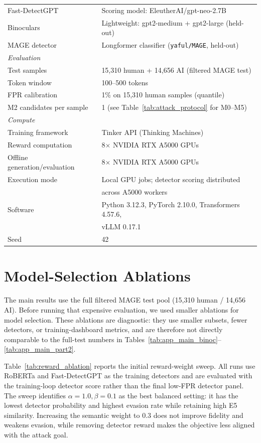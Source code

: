 \documentclass[11pt]{article}
\begin{document}
\begin{center}
{\begin{tabular}{ll}
Fast-DetectGPT & Scoring model: EleutherAI/gpt-neo-2.7B \\
Binoculars & Lightweight: gpt2-medium + gpt2-large (held-out) \\
MAGE detector & Longformer classifier (\texttt{yaful/MAGE}, held-out) \\
\midrule
\multicolumn{2}{l}{\textit{Evaluation}} \\
Test samples & 15,310 human + 14,656 AI (filtered MAGE test) \\
Token window & 100--500 tokens \\
FPR calibration & 1\% on 15,310 human samples (quantile) \\
M2 candidates per sample & 1 (see Table~\ref{tab:attack_protocol} for M0--M5) \\
\midrule
\multicolumn{2}{l}{\textit{Compute}} \\
Training framework & Tinker API (Thinking Machines) \\
Reward computation & 8$\times$ NVIDIA RTX A5000 GPUs \\
Offline generation/evaluation & 8$\times$ NVIDIA RTX A5000 GPUs \\
Execution mode & Local GPU jobs; detector scoring distributed \\
& across A5000 workers \\
Software & Python 3.12.3, PyTorch 2.10.0, Transformers 4.57.6, \\
& vLLM 0.17.1 \\
Seed & 42 \\
\bottomrule
\end{tabular}
}
\label{tab:hyperparams}
\end{center}

\FloatBarrier
\section{Model-Selection Ablations}
\label{app:ablations}

The main results use the full filtered MAGE test pool (15,310 human / 14,656 AI). Before running that expensive evaluation, we used smaller ablations for model selection. These ablations are diagnostic: they use smaller subsets, fewer detectors, or training-dashboard metrics, and are therefore not directly comparable to the full-test numbers in Tables~\ref{tab:app_main_binoc}--\ref{tab:app_main_part2}.

Table~\ref{tab:reward_ablation} reports the initial reward-weight sweep. All runs use RoBERTa and Fast-DetectGPT as the training detectors and are evaluated with the training-loop detector score rather than the final low-FPR detector panel. The sweep identifies $\alpha{=}1.0,\beta{=}0.1$ as the best balanced setting: it has the lowest detector probability and highest evasion rate while retaining high E5 similarity. Increasing the semantic weight to 0.3 does not improve fidelity and weakens evasion, while removing detector reward makes the objective less aligned with the attack goal.
\end{document}
